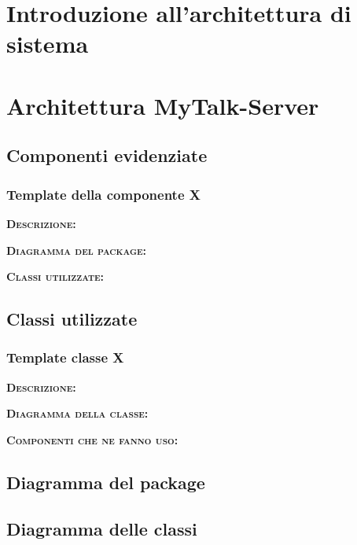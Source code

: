 \clearpage
\section{Introduzione all'architettura di sistema}

\clearpage
\section{Architettura MyTalk-Server}

\subsection{Componenti evidenziate}

\subsubsection{Template della componente X}
\begin{description}
	\item{\scshape\bfseries Descrizione:} 
	\item{\scshape\bfseries Diagramma del package:}
	\item{\scshape\bfseries Classi utilizzate:} 
\end{description}

\subsection{Classi utilizzate}

\subsubsection{Template classe X}
\begin{description}
	\item{\scshape\bfseries Descrizione:} 
	\item{\scshape\bfseries Diagramma della classe:}
	\item{\scshape\bfseries Componenti che ne fanno uso:} 
\end{description}

\subsection{Diagramma del package}

\subsection{Diagramma delle classi}
\clearpage

